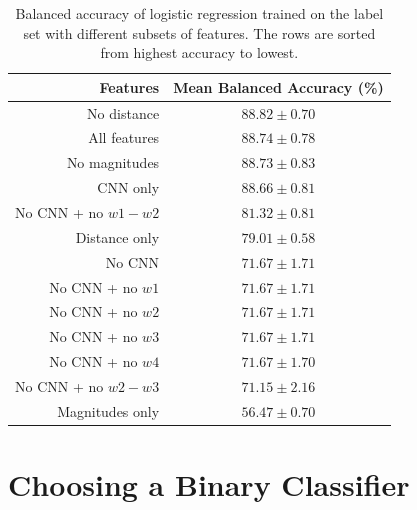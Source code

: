     \begin{table}[!ht]
      \centering
      \begin{tabular}{r|c}
        \textbf{Features} & \textbf{Mean Balanced Accuracy (\%)}\\\hline
        No distance & $88.82 \pm 0.70$\\
        All features & $88.74 \pm 0.78$\\
        No magnitudes & $88.73 \pm 0.83$\\
        CNN only & $88.66 \pm 0.81$\\
        No CNN + no $w1 - w2$ & $81.32 \pm 0.81$\\
        Distance only & $79.01 \pm 0.58$\\
        No CNN & $71.67 \pm 1.71$\\
        No CNN + no $w1$ & $71.67 \pm 1.71$\\
        No CNN + no $w2$ & $71.67 \pm 1.71$\\
        No CNN + no $w3$ & $71.67 \pm 1.71$\\
        No CNN + no $w4$ & $71.67 \pm 1.70$\\
        No CNN + no $w2 - w3$ & $71.15 \pm 2.16$\\
        Magnitudes only & $56.47 \pm 0.70$\\
      \end{tabular}
      \caption{Balanced accuracy of logistic regression trained on the
        \citeauthor{norris06} label set with different subsets of features. The
        rows are sorted from highest accuracy to lowest.}
      \label{tab:feature-ablation}
    \end{table}

\section{Choosing a Binary Classifier}
\label{sec:binary-classifiers}
  

